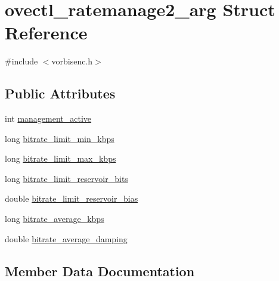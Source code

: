 \hypertarget{structovectl__ratemanage2__arg}{}\section{ovectl\+\_\+ratemanage2\+\_\+arg Struct Reference}
\label{structovectl__ratemanage2__arg}


{\ttfamily \#include $<$vorbisenc.\+h$>$}

\subsection*{Public Attributes}
\begin{DoxyCompactItemize}
\item 
int \mbox{\hyperlink{structovectl__ratemanage2__arg_aca1f656373a1597177dac924578e375b}{management\+\_\+active}}
\item 
long \mbox{\hyperlink{structovectl__ratemanage2__arg_aeb53a17fff14ec50d143602adfdeabeb}{bitrate\+\_\+limit\+\_\+min\+\_\+kbps}}
\item 
long \mbox{\hyperlink{structovectl__ratemanage2__arg_a175691482003edd7d94592fa2bc993a9}{bitrate\+\_\+limit\+\_\+max\+\_\+kbps}}
\item 
long \mbox{\hyperlink{structovectl__ratemanage2__arg_a75e496acac882e156137de9d1200ebd7}{bitrate\+\_\+limit\+\_\+reservoir\+\_\+bits}}
\item 
double \mbox{\hyperlink{structovectl__ratemanage2__arg_a5567fde1798b1e80e40a77565b4b44f4}{bitrate\+\_\+limit\+\_\+reservoir\+\_\+bias}}
\item 
long \mbox{\hyperlink{structovectl__ratemanage2__arg_a1f6bab60d87143d5060dd6c59aad6e71}{bitrate\+\_\+average\+\_\+kbps}}
\item 
double \mbox{\hyperlink{structovectl__ratemanage2__arg_a1069e148a884d8706928cd2e39870720}{bitrate\+\_\+average\+\_\+damping}}
\end{DoxyCompactItemize}


\subsection{Member Data Documentation}
\mbox{\label{structovectl__ratemanage2__arg_a1069e148a884d8706928cd2e39870720}} 
